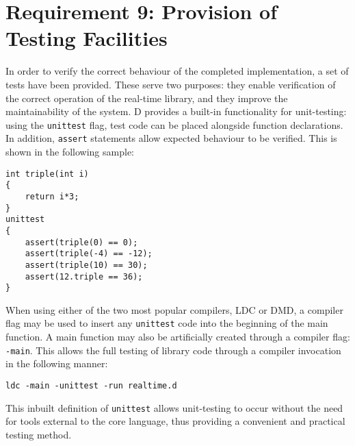 \section{Requirement 9: Provision of Testing Facilities}
In order to verify the correct behaviour of the completed implementation, a set 
of tests have been provided. These serve two purposes: they enable verification
of the correct operation of the real-time library, and they improve the
maintainability of the system. 
D provides a built-in 
functionality for unit-testing: using the \texttt{unittest} flag, test code can 
be placed alongside function declarations. In addition, \texttt{assert} statements 
allow expected behaviour to be verified. 
This is shown in the following sample:
\begin{lstlisting}[basicstyle=\small]
int triple(int i) 
{
    return i*3; 
}
unittest 
{
    assert(triple(0) == 0); 
    assert(triple(-4) == -12); 
    assert(triple(10) == 30); 
    assert(12.triple == 36);
}
\end{lstlisting}
When using either of the two most popular compilers, LDC or DMD, a compiler
flag may be used to insert any \texttt{unittest} code into the beginning of the 
main function.
A main function may also be artificially created through a compiler flag:
\texttt{-main}. This allows the full testing of library code through a compiler 
invocation in the following manner: 
\begin{lstlisting}[basicstyle=\small]
ldc -main -unittest -run realtime.d
\end{lstlisting}
This inbuilt definition of \texttt{unittest} allows unit-testing to occur 
without the need for tools external to the core language, thus providing a convenient 
and practical testing method. 
